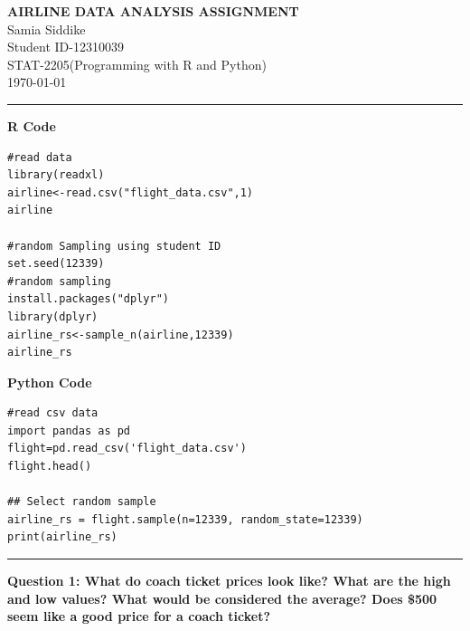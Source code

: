 \documentclass[11pt,a4paper]{article}
\begin{document}
\begin{center}
    {\huge \bfseries \sffamily AIRLINE DATA ANALYSIS ASSIGNMENT} \\[1.5em]
    {\large Samia Siddike} \\
    {\large Student ID-12310039} \\
    {\large STAT-2205(Programming with R and Python)} \\
    {\large \today} \\
    \vspace{2em}
    \strut\hrule
    \vspace{1.5em}
\end{center}

\vspace{0.5em}
\noindent \textbf{R Code}
\begin{codebox}
\begin{lstlisting}[style=Rstyle]
#read data
library(readxl)
airline<-read.csv("flight_data.csv",1)
airline

#random Sampling using student ID
set.seed(12339)
#random sampling
install.packages("dplyr")
library(dplyr)
airline_rs<-sample_n(airline,12339)
airline_rs
\end{lstlisting}
\end{codebox}
\vspace{1em}
\noindent \textbf{Python Code}
\begin{codebox}
\begin{lstlisting}[style=Pythonstyle]
#read csv data
import pandas as pd
flight=pd.read_csv('flight_data.csv')
flight.head()

## Select random sample
airline_rs = flight.sample(n=12339, random_state=12339)
print(airline_rs)
\end{lstlisting}
\end{codebox}
\vspace{2em}
\strut\hrule
\vspace{2em}

\noindent \textbf{\large Question 1:
What do coach ticket prices look like? What are the high and low values? What would be considered the average? Does \$500 seem like a good price for a coach ticket?}
\end{document}
